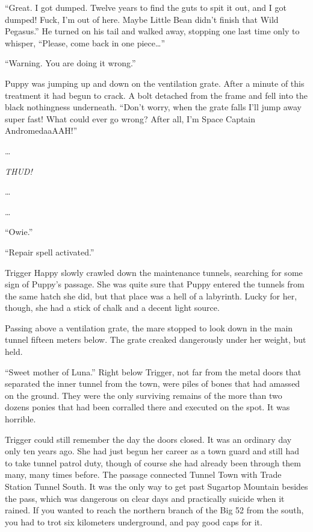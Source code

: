 ``Great. I got dumped. Twelve years to find the guts to spit it out, and I got dumped! Fuck, I'm out of here. Maybe Little Bean didn't finish that Wild Pegasus.'' He turned on his tail and walked away, stopping one last time only to whisper, ``Please, come back in one piece\dots''


\horizonline


{\mt ``Warning. You are doing it wrong.''}

Puppy was jumping up and down on the ventilation grate. After a minute of this treatment it had begun to crack. A bolt detached from the frame and fell into the black nothingness underneath. ``Don't worry, when the grate falls I'll jump away super fast! What could ever go wrong? After all, I'm Space Captain AndromedaaAAH!''

\dots

\emph{THUD!}

\dots

\dots

``Owie.''

{\mt ``Repair spell activated.''}


\horizonline


Trigger Happy slowly crawled down the maintenance tunnels, searching for some sign of Puppy's passage. She was quite sure that Puppy entered the tunnels from the same hatch she did, but that place was a hell of a labyrinth. Lucky for her, though, she had a stick of chalk and a decent light source.

Passing above a ventilation grate, the mare stopped to look down in the main tunnel fifteen meters below. The grate creaked dangerously under her weight, but held.

``Sweet mother of Luna.'' Right below Trigger, not far from the metal doors that separated the inner tunnel from the town, were piles of bones that had amassed on the ground. They were the only surviving remains of the more than two dozens ponies that had been corralled there and executed on the spot. It was horrible.

Trigger could still remember the day the doors closed. It was an ordinary day only ten years ago. She had just begun her career as a town guard and still had to take tunnel patrol duty, though of course she had already been through them many, many times before. The passage connected Tunnel Town with Trade Station Tunnel South. It was the only way to get past Sugartop Mountain besides the pass, which was dangerous on clear days and practically suicide when it rained. If you wanted to reach the northern branch of the Big 52 from the south, you had to trot six kilometers underground, and pay good caps for it.

